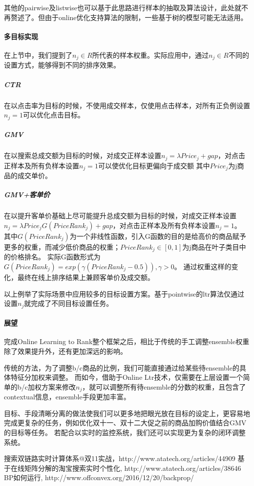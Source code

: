 其他的pairwise及listwise也可以基于此思路进行样本的抽取及算法设计，此处就不再赘述了。但由于online优化支持算法的限制，一些基于树的模型可能无法适用。

\paragraph{多目标实现}
在上节中，我们提到了$n_j\in{R}$所代表的样本权重。实际应用中，通过$n_j\in{R}$不同的设置方式，能够得到不同的排序效果。

\subparagraph{CTR}
在以点击率为目标的时候，不使用成交样本，仅使用点击样本，对所有正负例设置$n_j=1$可以优化点击目标。

\subparagraph{GMV}
在以搜索总成交额为目标的时候，对成交正样本设置$n_j=\lambda Price_j+gap$，对点击正样本及所有负样本设置$n_j=1$可以使优化目标更偏向于成交额
其中$Price_j$为j商品的成交单价。

\subparagraph{GMV+客单价}
在以提升客单价基础上尽可能提升总成交额为目标的时候，对成交正样本设置$n_j=\lambda Price_jG(PriceRank_j)+gap$，对点击正样本及所有负样本设置$n_j=1$。
其中$G(PriceRank_j)$为一个非线性函数，引入G函数的目的是给高价的商品赋予更多的权重，而减少低价商品的权重；$PriceRank_j\in [0,1]$为j商品在叶子类目中的价格排名。
实际G函数形式为$G(PriceRank_j)=exp(\gamma (PriceRank_j-0.5)), \gamma>0$。
通过权重这样的变化，最终在线上排序结果上兼顾客单价及成交额。

以上例举了实际场景中应用较多的目标设置方案。基于pointwise的ltr算法仅通过设置$n_j$就完成了不同目标设置任务。

\paragraph{展望}
完成Online Learning to Rank整个框架之后，相比于传统的手工调整ensemble权重除了效果提升外，还有更加深远的影响。

传统的方法，为了调整b/c商品的比例，我们可能直接通过给某些待ensemble的具体特征分加权来调整。
而如今，借助于Online Ltr技术，仅需要在上层设置一个简单的b/c加权方案来修改$n_j$，就可以调整所有待ensemble的分数的权重，且包含了contextual信息，ensemble手段更加丰富。

目标、手段清晰分离的做法使我们可以更多地把眼光放在目标的设定上，更容易地完成更复杂的任务，例如优化双十一、双十二大促之前的商品加购价值结合GMV的目标等任务。
若配合以实时的监控系统，我们还可以实现更为复杂的闭环调整系统。


\begin{thebibliography}{99}
 搜索双链路实时计算体系@双11实战，http://www.atatech.org/articles/44909
 基于在线矩阵分解的淘宝搜索实时个性化, http://www.atatech.org/articles/38646
 BP如何运行, http://www.offconvex.org/2016/12/20/backprop/
\end{thebibliography}

 
